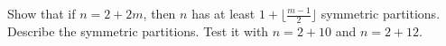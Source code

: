 Show that if $n = 2 + 2m$,
then $n$ has at least $1 + \lfloor \frac{m-1}{2} \rfloor$
symmetric partitions. 
Describe the symmetric partitions.
Test it with $n = 2 + 10$ and $n = 2 + 12$.
